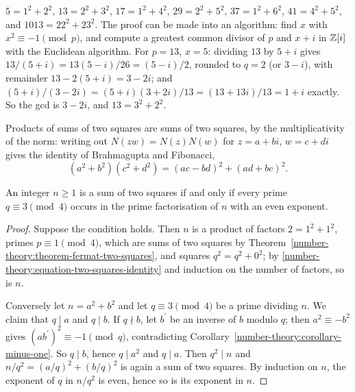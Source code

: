 \begin{example}\label{number-theory:example-fermat}
$5 = 1^2 + 2^2$, $13 = 2^2 + 3^2$, $17 = 1^2 + 4^2$, $29 = 2^2 + 5^2$, $37 = 1^2 + 6^2$, $41 = 4^2 + 5^2$, and $1013 = 22^2 + 23^2$. The proof can be made into an algorithm: find $x$ with
$x^2 \equiv -1 \pmod p$, and compute a greatest common divisor of $p$ and $x + i$ in $\mathbb{Z}[i]$ with the Euclidean algorithm. For $p = 13$, $x = 5$: dividing $13$ by $5 + i$ gives
$13/(5 + i) = 13(5 - i)/26 = (5 - i)/2$, rounded to $q = 2$ (or $3 - i$), with remainder $13 - 2(5 + i) = 3 - 2i$; and $(5 + i)/(3 - 2i) = (5 + i)(3 + 2i)/13 = (13 + 13i)/13 = 1 + i$ exactly. So the gcd
is $3 - 2i$, and $13 = 3^2 + 2^2$.
\end{example}

Products of sums of two squares are sums of two squares, by the multiplicativity of the norm: writing out $N(zw) = N(z)N(w)$ for $z = a + bi$, $w = c + di$ gives the identity of Brahmagupta and Fibonacci,
\begin{equation}\label{number-theory:equation-two-squares-identity}
(a^2 + b^2)(c^2 + d^2) = (ac - bd)^2 + (ad + bc)^2 .
\end{equation}

\begin{theorem}\label{number-theory:theorem-two-squares}
An integer $n \geq 1$ is a sum of two squares if and only if every prime $q \equiv 3 \pmod 4$ occurs in the prime factorisation of $n$ with an even exponent.
\end{theorem}

\begin{proof}
Suppose the condition holds. Then $n$ is a product of factors $2 = 1^2 + 1^2$, primes $p \equiv 1 \pmod 4$, which are sums of two squares by Theorem~\ref{number-theory:theorem-fermat-two-squares}, and
squares $q^2 = q^2 + 0^2$; by \eqref{number-theory:equation-two-squares-identity} and induction on the number of factors, so is $n$.

Conversely let $n = a^2 + b^2$ and let $q \equiv 3 \pmod 4$ be a prime dividing $n$. We claim that $q \mid a$ and $q \mid b$. If $q \nmid b$, let $b^{\prime}$ be an inverse of $b$ modulo $q$; then
$a^2 \equiv -b^2$ gives $(ab^{\prime})^2 \equiv -1 \pmod q$, contradicting Corollary~\ref{number-theory:corollary-minus-one}. So $q \mid b$, hence $q \mid a^2$ and $q \mid a$. Then $q^2 \mid n$ and
$n/q^2 = (a/q)^2 + (b/q)^2$ is again a sum of two squares. By induction on $n$, the exponent of $q$ in $n/q^2$ is even, hence so is its exponent in $n$.
\end{proof}

